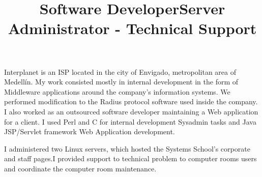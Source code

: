 \begin{resume}
\title{\textbf{Software Developer}}
\begin{position}
Interplanet is an  ISP located in the city of Envigado, metropolitan area of Medell\'{i}n.
My work consisted mostly  in internal development in the form of
Middleware applications  around the company's information systems.
We performed modification to the Radius protocol software used inside the company.
I also worked as an outsourced software developer maintaining a Web application
for a client.  I used Perl and C for internal development Sysadmin
tasks and  Java JSP/Servlet framework Web Application development.
\end{position}
\newline
\newline
\newline
\newline
\newline
\newline
\newline

\title{\textbf{Server Administrator - Technical Support}}
\begin{position}
I administered two Linux servers, which hosted the Systems School's
corporate and staff pages.I provided support to technical problem 
to computer rooms users and coordinate the computer room maintenance.
\end{position}
\newline






\end{resume}
